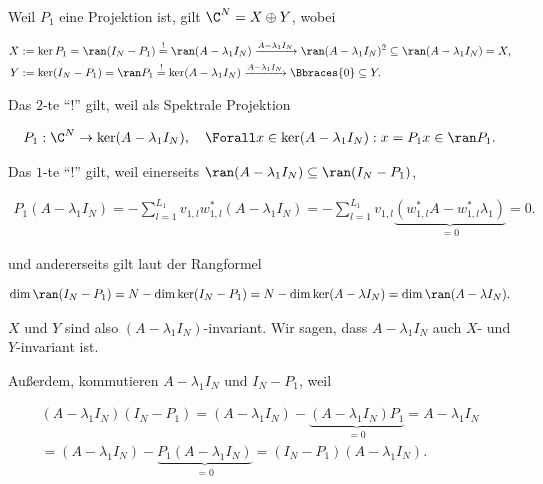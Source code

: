 \begin{remark} \label{rem:spektrale_projektion_linear}

    Weil $P_1$ eine Projektion ist, gilt $\C^N = X \oplus Y$, wobei

    \begin{align*}
        X & := \ker P_1 = \ran (I_N - P_1) \stackrel{!}{=} \ran (A - \lambda_1 I_N) \xrightarrow{A - \lambda_1 I_N} \ran (A - \lambda_1 I_N)^2 \subseteq \ran (A - \lambda_1 I_N) = X, \\
        Y & := \ker (I_N - P_1) = \ran P_1 \stackrel{!}{=} \ker (A - \lambda_1 I_N) \xrightarrow{A - \lambda_1 I_N} \Bbraces{0} \subseteq Y.
    \end{align*}

    Das $2$-te \enquote{!} gilt, weil als Spektrale Projektion

    \begin{align*}
        P_1: \C^N \to \ker (A - \lambda_1 I_N),
        \quad
        \Forall x \in \ker (A - \lambda_1 I_N):
            x = P_1 x \in \ran P_1.
    \end{align*}

    Das $1$-te \enquote{!} gilt, weil einerseits $\ran (A - \lambda_1 I_N) \subseteq \ran (I_N - P_1)$,

    \begin{align*}
        P_1 (A - \lambda_1 I_N)
        =
        -\sum_{l=1}^{L_1}
            v_{1, l} w_{1, l}^\ast
        (A - \lambda_1 I_N)
        =
        -\sum_{l=1}^{L_1}
            v_{1, l}
            \underbrace
            {
                (w_{1, l}^\ast A
                -
                w_{1, l}^\ast \lambda_1)
            }_{=0}
        =
        0.
    \end{align*}

    und andererseits gilt laut der Rangformel

    \begin{align*}
        \dim \ran (I_N - P_1)
        =
        N - \dim \ker (I_N - P_1)
        =
        N - \dim \ker (A - \lambda I_N)
        =
        \dim \ran (A - \lambda I_N).
    \end{align*}

    $X$ und $Y$ sind also $(A - \lambda_1 I_N)$-invariant.
    Wir sagen, dass $A - \lambda_1 I_N$ auch $X$- und $Y$-invariant ist.

    Außerdem, kommutieren $A - \lambda_1 I_N$ und $I_N - P_1$, weil

    \begin{multline*}
        (A - \lambda_1 I_N) (I_N - P_1)
        =
        (A - \lambda_1 I_N) - \underbrace{(A - \lambda_1 I_N) P_1}_{=0}
        =
        A - \lambda_1 I_N \\
        =
        (A - \lambda_1 I_N) - \underbrace{P_1 (A - \lambda_1 I_N)}_{=0}
        =
        (I_N - P_1) (A - \lambda_1 I_N).
    \end{multline*}

\end{remark}
